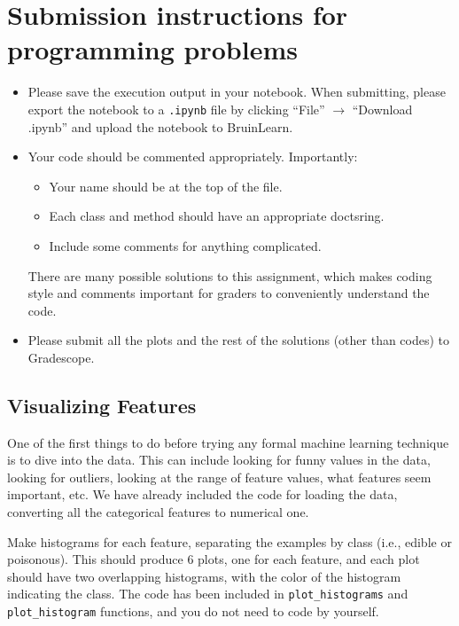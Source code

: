 \section*{Submission instructions for programming problems}
\begin{itemize}
\item Please save the execution output in your notebook. When submitting, please export the notebook to a \verb|.ipynb| file by clicking ``File'' $\rightarrow$ ``Download .ipynb'' and upload the notebook to BruinLearn.

\item
Your code should be commented appropriately. Importantly:
\begin{itemize}[nosep]
\item Your name should be at the top of the file.
\item Each class and method should have an appropriate doctsring.
\item Include some comments for anything complicated.
\end{itemize}

There are many possible solutions to this assignment, which makes coding style and comments important for graders to conveniently understand the code. 

\item Please submit all the plots and the rest of the solutions (other than codes) to Gradescope.
\end{itemize}


\subsection{Visualizing Features }
One of the first things to do before trying any formal machine learning technique is to dive into the data. This can include looking for funny values in the data, looking for outliers, looking at the range of feature values, what features seem important, etc.
We have already included the code for loading the data, converting all the categorical features to numerical one.

Make histograms for each feature, separating the examples by class (i.e., edible or poisonous).
This should produce 6 plots, one for each feature, and each plot should have two overlapping histograms, with the color of the histogram indicating the class. 
The code has been included in \texttt{plot\_histograms} and \texttt{plot\_histogram} functions, and you do not need to code by yourself.

